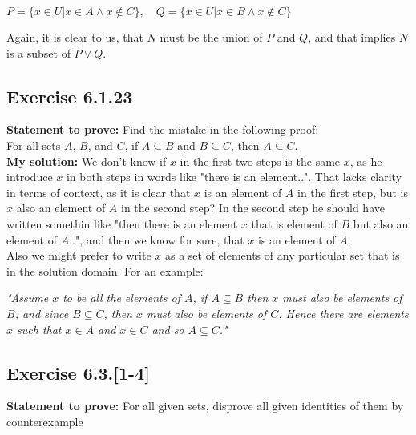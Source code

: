 \documentclass{report}
\newcommand{\cent}[1]{\begin{center}#1\end{center}}
\newcommand{\In}{\! \in \!}
\newcommand{\Prove}{\textbf{Statement to prove: }}
\newcommand{\solution}{\textbf{My solution: }}
\newcommand{\QED}{\boxed{}}
\newcommand{\Exercise}[1]{\subsection{Exercise #1}}
\begin{document}
	\cent{$P = \{x \In U | x \In A \wedge x \notin C\}, \quad Q = \{x \In U | x \In B \wedge x \notin C\}$}
	
	Again, it is clear to us, that $N$ must be the union of $P$ and $Q$, and that implies $N$ is a subset of $P \vee Q$.\\
	\QED
	
	\Exercise{6.1.23}
	
	\Prove
	Find the mistake in the following proof:\\
	
	For all sets $A$, $ B $, and $ C $, if $ A \subseteq B $ and $ B \subseteq C $, then $ A \subseteq C $.\\
	
	\solution
	We don't know if $x$ in the first two steps is the same $x$, as he introduce $x$ in both steps in words like  "there is an element..". That lacks clarity in terms of context, as it is clear that $x$ is an element of  $A$ in the first step, but is $x$ also an element of $A$ in the second step? In the second step he should have written somethin like "then there is an element $ x $ that is element of $ B $ but also an element of $ A $..", and then we know for sure, that $x$ is an element of $A$.\\
	
	Also we might prefer to write $x$ as a set of elements of any particular set that is in the solution domain. For an example:
	
	\begin{center}
		\textit{"Assume $ x $ to be all the elements of $ A $, if $ A \subseteq B$ then $x$ must also be elements of $B$, and since $B \subseteq C$, then $x$ must also be elements of $C$. Hence there are elements $x$ such that $ x \In A $ and $ x \In C $ and so $ A \subseteq C $."}
	\end{center}

	\Exercise{6.3.[1-4]}
	
	\Prove
	For all given sets, disprove all given identities of them by counterexample
	
\end{document}
